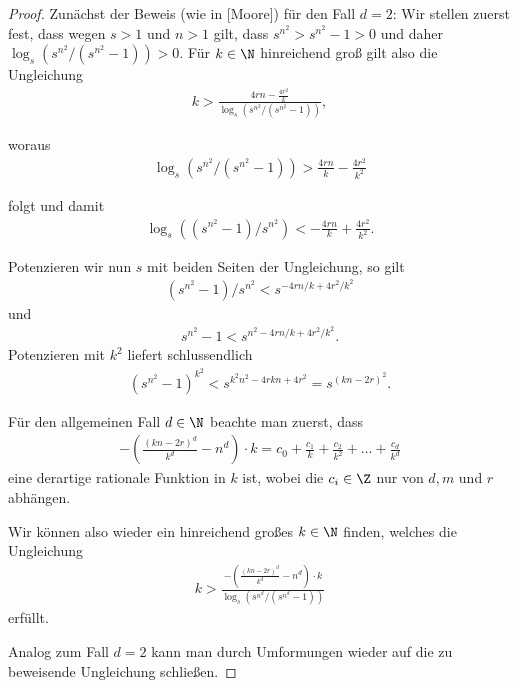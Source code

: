 \begin{proof}
  Zunächst der Beweis (wie in [Moore]) für den Fall $d = 2$:
  Wir stellen zuerst fest, dass wegen $s>1$ und $n>1$ gilt, dass $s^{n^2} > s^{n^2} -1 > 0$ und daher $\log_s (s^{n^2}/(s^{n^2}-1)) > 0$. Für $k \in \N$ hinreichend groß gilt also die Ungleichung
  \begin{align*}
    k > \frac{4rn-\frac{4r^2}{k}}{\log_s (s^{n^2}/(s^{n^2}-1))},
  \end{align*}

  woraus
  \begin{align*}
    \log_s (s^{n^2}/(s^{n^2}-1)) > \frac{4rn}{k} - \frac{4r^2}{k^2}
  \end{align*}

  folgt und damit
  \begin{align*}
    \log_s ((s^{n^2}-1)/s^{n^2}) < - \frac{4rn}{k} + \frac{4r^2}{k^2}.
  \end{align*}

  Potenzieren wir nun $s$ mit beiden Seiten der Ungleichung, so gilt
  \begin{align*}
    (s^{n^2}-1)/s^{n^2} < s^{- 4rn/k + 4r^2/k^2}
  \end{align*}
  und
  \begin{align*}
    s^{n^2}-1 < s^{n^2 - 4rn/k + 4r^2/k^2}.
  \end{align*}
  Potenzieren mit $k^2$ liefert schlussendlich
  \begin{align*}
    (s^{n^2}-1)^{k^2} < s^{k^2 n^2 - 4rkn + 4r^2} = s^{(kn-2r)^2}.
  \end{align*}

  Für den allgemeinen Fall $d \in \N$ beachte man zuerst, dass
  \begin{align*}
    -\left(\frac{(kn-2r)^d}{k^d}-n^d\right) \cdot k = c_0 + \frac{c_1}{k} + \frac{c_2}{k^2} + \dots + \frac{c_d}{k^d}
  \end{align*}
  eine derartige rationale Funktion in $k$ ist, wobei die $c_i \in \Z$ nur von $d, m$ und $r$ abhängen.

  Wir können also wieder ein hinreichend großes $k \in \N$ finden, welches die Ungleichung
  \begin{align*}
    k > \frac{-\left(\frac{(kn-2r)^d}{k^d}-n^d \right) \cdot k}{\log_s (s^{n^d}/(s^{n^d}-1))}
  \end{align*}
  erfüllt.

  Analog zum Fall $d=2$ kann man durch Umformungen wieder auf die zu beweisende Ungleichung schließen.
\end{proof}

